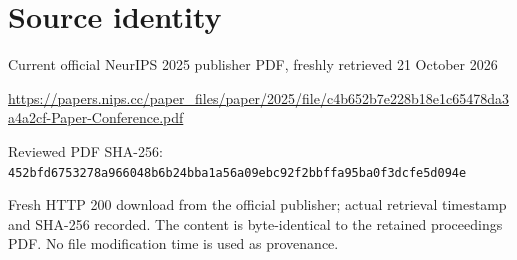 \documentclass[11pt]{article}
\begin{document}
\section*{Source identity}

Current official NeurIPS 2025 publisher PDF, freshly retrieved 21 October 2026

\url{https://papers.nips.cc/paper_files/paper/2025/file/c4b652b7e228b18e1c65478da3a4a2cf-Paper-Conference.pdf}

Reviewed PDF SHA-256: \nolinkurl{452bfd6753278a966048b6b24bba1a56a09ebc92f2bbffa95ba0f3dcfe5d094e}

Fresh HTTP 200 download from the official publisher; actual retrieval timestamp and SHA-256 recorded. The content is byte-identical to the retained proceedings PDF. No file modification time is used as provenance.
\end{document}
